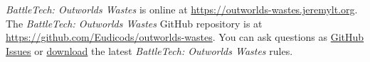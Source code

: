 \emph{BattleTech: Outworlds Wastes} is online at \href{https://outworlds-wastes.jeremylt.org}{https://outworlds-wastes.jeremylt.org}.
The \emph{BattleTech: Outworlds Wastes} GitHub repository is at \href{https://github.com/Eudicods/outworlds-wastes}{https://github.com/Eudicods/outworlds-wastes}.
You can ask questions as \href{https://github.com/Eudicods/outworlds-wastes/issues}{GitHub Issues} or \href{https://raw.githubusercontent.com/Eudicods/outworlds-wastes/rules-pdf/battletech-outworlds-wastes.pdf}{download} the latest \emph{BattleTech: Outworlds Wastes} rules.
